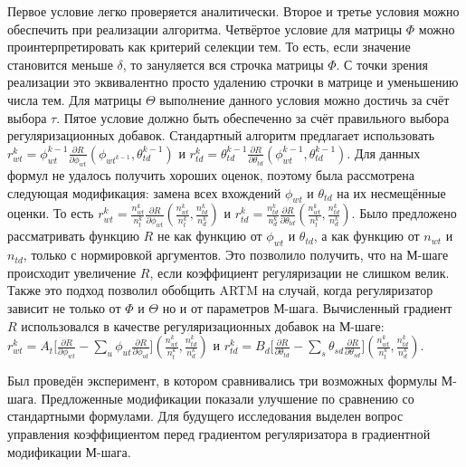 \documentclass[12pt, twoside]{article}
\begin{document}
Первое условие легко проверяется аналитически. Второе и третье условия можно обеспечить при реализации алгоритма. Четвёртое условие для матрицы $\Phi$ можно проинтерпретировать как критерий селекции тем. То есть, если значение становится меньше $\delta$, то зануляется вся строчка матрицы $\Phi$. С точки зрения реализации это эквивалентно просто удалению строчки в матрице и уменьшению числа тем. Для матрицы $\Theta$ выполнение данного условия можно достичь за счёт выбора $\tau$. Пятое условие должно быть обеспеченно за счёт правильного выбора регуляризационных добавок. Стандартный алгоритм предлагает использовать $r_{wt}^{k} = \phi_{wt}^{k-1} \frac{\partial{R}}{\partial{\phi_{wt}}}(\phi_{wt^{k-1}}, \theta_{td}^{k-1})$ и $r_{td}^{k}=  \theta_{td}^{k-1} \frac{\partial{R}}{\partial{\theta_{td}}}(\phi_{wt}^{k-1}, \theta_{td}^{k-1})$. Для данных формул не удалось получить хороших оценок, поэтому была рассмотрена следующая модификация: замена всех вхождений $\phi_{wt}$ и $\theta_{td}$ на их несмещённые оценки. То есть  $r_{wt}^k=  \frac{n^k_{wt}}{n^k_t}\frac{\partial{R}}{\partial{\phi_{wt}}}\left(\frac{n^k_{wt}}{n^k_t}, \frac{n^k_{td}}{n^k_d}\right)$ и $r_{td}^k=  \frac{n^k_{td}}{n^k_d}\frac{\partial{R}}{\partial{\theta_{td}}}\left(\frac{n^k_{wt}}{n^k_t}, \frac{n^k_{td}}{n^k_d}\right)$. Было предложено рассматривать функцию $R$ не как функцию от $\phi_{wt}$ и $\theta_{td}$, а как функцию от $n_{wt}$ и $n_{td}$, только с нормировкой аргументов. Это позволило получить, что на М-шаге происходит увеличение $R$, если коэффициент регуляризации не слишком велик. Также это подход позволил обобщить ARTM на случай, когда регуляризатор зависит не только от $\Phi$  и $\Theta$ но и от параметров М-шага. Вычисленный градиент $R$ использовался  в качестве регуляризационных добавок на М-шаге: $r^k_{wt} =  A_t \bigl[{\frac{\partial{R}}{\partial{\phi_{wt}}} - \sum\limits_u \phi_{ut} \frac{\partial{R}}{\partial{\phi_{ut}}} }\bigr] \left(\frac{n^k_{wt}}{n^k_t}, \frac{n^k_{td}}{n^k_d}\right)$ и $r^k_{td} =  B_d \bigl[ {\frac{\partial{R}}{\partial{\theta_{td}}} - \sum\limits_s \theta_{sd} \frac{\partial{R}}{\partial{\theta_{sd}}} }\bigr] \left(\frac{n^k_{wt}}{n^k_t}, \frac{n^k_{td}}{n^k_d}\right)$.

Был проведён эксперимент, в котором сравнивались три возможных формулы М-шага. Предложенные модификации показали улучшение по сравнению со стандартными формулами. Для будущего исследования выделен вопрос управления коэффициентом перед градиентом регуляризатора в градиентной модификации М-шага.
\end{document}

